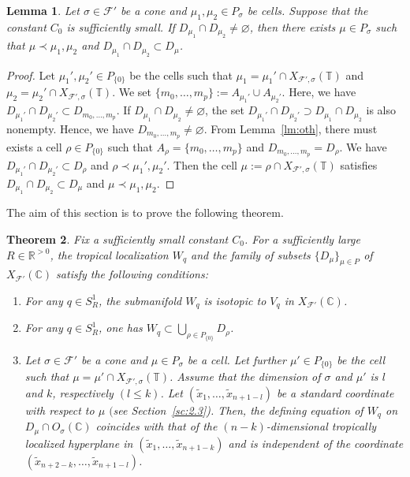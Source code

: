 \documentclass[pdftex]{sigma}
\numberwithin{equation}{section}
\newtheorem{Theorem}{Theorem}[section]
\newtheorem{Lemma}[Theorem]{Lemma}
\begin{document}
\begin{Lemma}\label{lm:usig}
Let $\sigma \in {\mathcal F}'$ be a cone and $\mu_1, \mu_2 \in P_\sigma$ be cells.
Suppose that the constant $C_0$ is sufficiently small.
If $D_{\mu_1} \cap D_{\mu_2} \neq \varnothing$, then there exists $\mu \in P_\sigma$ such that $\mu \prec \mu_1, \mu_2$ and $D_{\mu_1} \cap D_{\mu_2} \subset D_\mu$.
\end{Lemma}
\begin{proof}
Let $\mu_1', \mu_2' \in P_{\{0\}}$ be the cells such that
$\mu_1=\mu_1' \cap X_{{\mathcal F}',\sigma}({\mathbb T})$ and $\mu_2=\mu_2' \cap X_{{\mathcal F}',\sigma}({\mathbb T})$.
We set $\{m_0, \dots, m_{p}\}:=A_{\mu_1'} \cup A_{\mu_2'}$.
Here, we have $D_{\mu_1'} \cap D_{\mu_2'} \subset D_{m_0, \dots, m_p}$.
If $D_{\mu_1} \cap D_{\mu_2} \neq \varnothing$, the set $D_{\mu_1'} \cap D_{\mu_2'} \supset D_{\mu_1} \cap D_{\mu_2}$ is also nonempty.
Hence, we have $D_{m_0, \dots, m_p} \neq \varnothing$.
From Lemma~\ref{lm:oth}, there must exists a cell $\rho \in P_{\{0\}}$ such that $A_\rho=\{m_0, \dots, m_p\}$ and $D_{m_0, \dots, m_p}=D_\rho$.
We have $D_{\mu_1'} \cap D_{\mu_2'} \subset D_\rho$ and $\rho \prec \mu_1', \mu_2'$.
Then the cell $\mu:=\rho \cap X_{{\mathcal F}',\sigma}({\mathbb T})$ satisf\/ies $D_{\mu_1} \cap D_{\mu_2} \subset D_\mu$ and $\mu \prec \mu_1, \mu_2$.
\end{proof}

The aim of this section is to prove the following theorem.

\begin{Theorem}\label{th:sub}
Fix a sufficiently small constant $C_0$.
For a sufficiently large $R \in {\mathbb R}^{>0}$, the tropical localization $W_q$ and the family of subsets $\{D_\mu\}_{\mu \in P}$ of $X_{{\mathcal F}'}({\mathbb C})$ satisfy the following conditions:
\begin{enumerate}\itemsep=0pt
\item[$1.$] For any $q \in S_R^1$, the submanifold $W_q$ is isotopic to $V_q$ in $X_{{\mathcal F}'}({\mathbb C})$.%
\item[$2.$] For any $q \in S_R^1$, one has $W_q \subset \bigcup_{\rho \in P_{\{0\}}} D_\rho$.%
\item[$3.$] Let $\sigma \in {\mathcal F}'$ be a cone and $\mu \in P_\sigma$ be a cell.
Let further $\mu' \in P_{\{0\}}$ be the cell such that $\mu = \mu' \cap X_{{\mathcal F}',\sigma}({\mathbb T})$.
Assume that the dimension of $\sigma$ and $\mu'$ is $l$ and $k$, respectively $(l \leq k)$.
Let $(\tilde{x}_1, \dots, \tilde{x}_{n+1-l})$ be a standard coordinate with respect to $\mu$ $($see Section~{\rm \ref{sc:2.3})}.
Then, the defining equation of $W_q$ on $D_\mu \cap O_\sigma({\mathbb C})$ coincides with that of the $(n-k)$-dimensional tropically localized hyperplane in $(\tilde{x}_1, \dots, \tilde{x}_{n+1-k})$ and is independent of the coordinate $(\tilde{x}_{n+2-k}, \dots, \tilde{x}_{n+1-l})$.%
\end{enumerate}
\end{Theorem}
\end{document}
